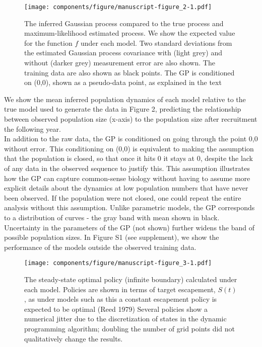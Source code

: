 \documentclass[author-year, 12pt,review]{components/elsarticle} %
\makeatletter
\def\maxwidth{\ifdim\Gin@nat@width>\linewidth\linewidth
\else\Gin@nat@width\fi}
\let\Oldincludegraphics\includegraphics
\renewcommand{\includegraphics}[1]{\Oldincludegraphics[width=\maxwidth]{#1}}
\makeatother
\begin{document}
\begin{figure}[htbp]
\centering
\texttt{[image: components/figure/manuscript-figure\_2-1.pdf]}
\caption{The inferred Gaussian process compared to the true process and
maximum-likelihood estimated process. We show the expected value for the
function $f$ under each model. Two standard deviations from the
estimated Gaussian process covariance with (light grey) and without
(darker grey) measurement error are also shown. The training data are
also shown as black points. The GP is conditioned on (0,0), shown as a
pseudo-data point, as explained in the text}
\end{figure}

We show the mean inferred population dynamics of each model relative to
the true model used to generate the data in Figure 2, predicting the
relationship between observed population size (x-axis) to the population
size after recruitment the following year.\\In addition to the raw data,
the GP is conditioned on going through the point 0,0 without error. This
conditioning on (0,0) is equivalent to making the assumption that the
population is closed, so that once it hits 0 it stays at 0, despite the
lack of any data in the observed sequence to justify this. This
assumption illustrates how the GP can capture common-sense biology
without having to assume more explicit details about the dynamics at low
population numbers that have never been observed. If the population were
not closed, one could repeat the entire analysis without this
assumption. Unlike parametric models, the GP corresponds to a
distribution of curves - the gray band with mean shown in black.
Uncertainty in the parameters of the GP (not shown) further widens the
band of possible population sizes. In Figure S1 (see supplement), we
show the performance of the models outside the observed training data.

\begin{figure}[htbp]
\centering
\texttt{[image: components/figure/manuscript-figure\_3-1.pdf]}
\caption{The steady-state optimal policy (infinite boundary) calculated
under each model. Policies are shown in terms of target escapement,
$S(t)$, as under models such as this a constant escapement policy is
expected to be optimal (Reed 1979) Several policies show a numerical
jitter due to the discretization of states in the dynamic programming
algorithm; doubling the number of grid points did not qualitatively
change the results.}
\end{figure}
\end{document}
